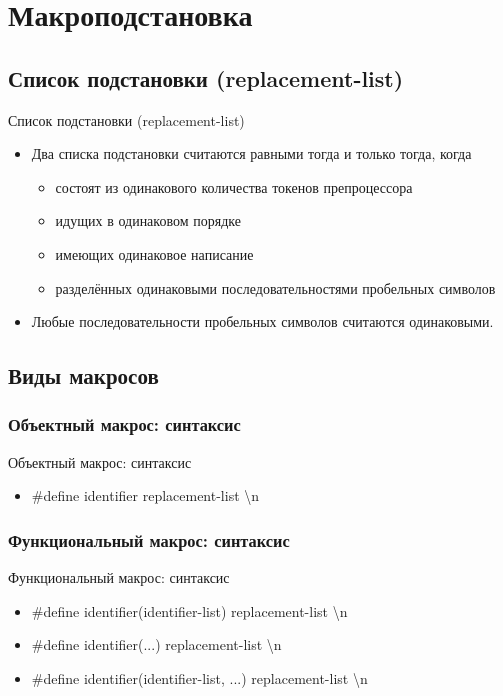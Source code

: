 


    

    \section{Макроподстановка}
    \subsection{Список подстановки (replacement-list)}
    \begin{frame}{Список подстановки (replacement-list)}
        \begin{itemize}
            \item Два списка подстановки считаются равными тогда и только тогда, когда
                \begin{itemize}
                    \item состоят из одинакового количества токенов препроцессора
                    \item идущих в одинаковом порядке
                    \item имеющих одинаковое написание
                    \item разделённых одинаковыми последовательностями пробельных символов
                \end{itemize}
            \item Любые последовательности пробельных символов считаются одинаковыми.
        \end{itemize}
    \end{frame}
    \subsection{Виды макросов}
    \subsubsection{Объектный макрос: синтаксис}
    \begin{frame}{Объектный макрос: синтаксис}
        \begin{itemize}
            \item \#define identifier replacement-list \textbackslash{n}
        \end{itemize}
    \end{frame}
    \subsubsection{Функциональный макрос: синтаксис}
    \begin{frame}{Функциональный макрос: синтаксис}
        \begin{itemize}
            \item \#define identifier(identifier-list) replacement-list \textbackslash{n}
            \item \#define identifier(...) replacement-list \textbackslash{n}
            \item \#define identifier(identifier-list, ...) replacement-list \textbackslash{n}
        \end{itemize}
    \end{frame}
